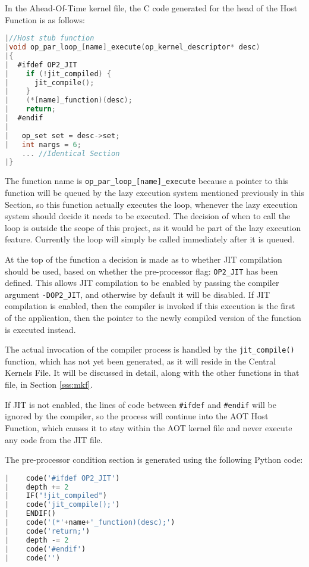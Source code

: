 In the Ahead-Of-Time kernel file, the C code generated for the head of the Host Function is as follows:

\begin{lstlisting}[linewidth = \textwidth, framesep=0pt, language=C, linebackgroundcolor={\ifnum\value{lstnumber}>10 \color{red!20} \else \color{blue!20} \fi}]
|//Host stub function
|void op_par_loop_[name]_execute(op_kernel_descriptor* desc)
|{
|  #ifdef OP2_JIT
|    if (!jit_compiled) {
|      jit_compile();
|    }
|    (*[name]_function)(desc);
|    return;
|  #endif
|
|   op_set set = desc->set;
|   int nargs = 6;
    ... //Identical Section
|}
\end{lstlisting}


\noindent The function name is \verb|op_par_loop_[name]_execute| because a pointer to this function will be queued by the lazy execution system mentioned previously in this Section, so this function actually executes the loop, whenever the lazy execution system should decide it needs to be executed. The decision of when to call the loop is outside the scope of this project, as it would be part of the lazy execution feature. Currently the loop will simply be called immediately after it is queued.
\par
At the top of the function a decision is made as to whether JIT compilation should be used, based on whether the pre-processor flag: \verb|OP2_JIT| has been defined. This allows JIT compilation to be enabled by passing the compiler argument \verb|-DOP2_JIT|, and otherwise by default it will be disabled. If JIT compilation is enabled, then the compiler is invoked if this execution is the first of the application, then the pointer to the newly compiled version of the function is executed instead.
\par
The actual invocation of the compiler process is handled by the \verb|jit_compile()| function, which has not yet been generated, as it will reside in the Central Kernels File. It will be discussed in detail, along with the other functions in that file, in Section \ref{sss:mkf}.
\par
If JIT is not enabled, the lines of code between \verb|#ifdef| and \verb|#endif| will be ignored by the compiler, so the process will continue into the AOT Host Function, which causes it to stay within the AOT kernel file and never execute any code from the JIT file.
\par
The pre-processor condition section is generated using the following Python code:
\begin{lstlisting}[backgroundcolor=\color{lightgray!20}, language=Python]
|    code('#ifdef OP2_JIT')
|    depth += 2
|    IF("!jit_compiled")
|    code('jit_compile();')
|    ENDIF()
|    code('(*'+name+'_function)(desc);')
|    code('return;')
|    depth -= 2
|    code('#endif')
|    code('')
\end{lstlisting}

